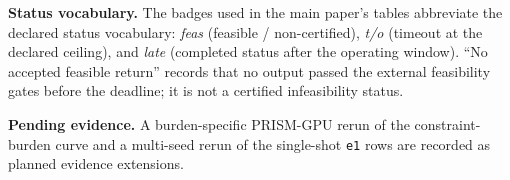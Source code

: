 \documentclass[10pt,a4paper]{extarticle}
\begin{document}
\textbf{Status vocabulary.} The badges used in the main paper's tables
abbreviate the declared status vocabulary: \emph{feas} (feasible /
non-certified), \emph{t/o} (timeout at the declared ceiling), and \emph{late}
(completed status after the operating window). ``No accepted feasible
return'' records that no output passed the external feasibility gates before
the deadline; it is not a certified infeasibility status.

\textbf{Pending evidence.} A burden-specific PRISM-GPU rerun of the
constraint-burden curve and a multi-seed rerun of the single-shot
\texttt{e1} rows are recorded as planned evidence extensions.
\end{document}
